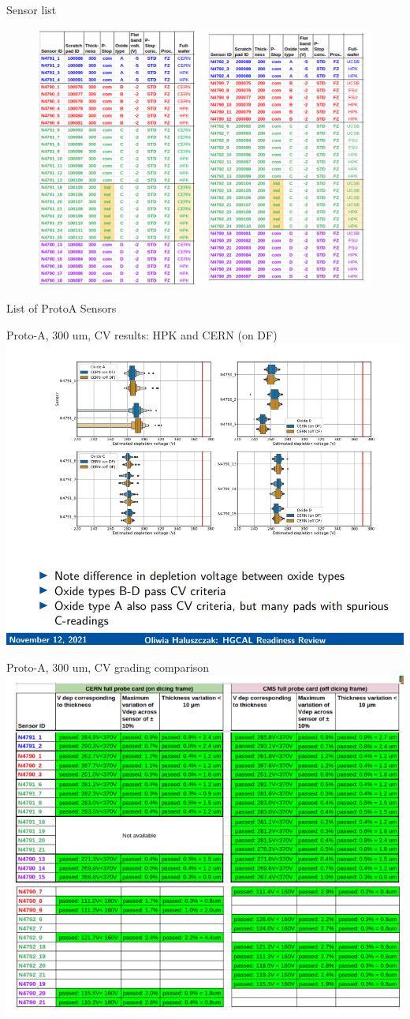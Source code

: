 \documentclass{beamer}
\begin{document}
\begin{frame}{Sensor list}
   \begin{figure}
       \includegraphics[width=.8\textwidth]{plots/Fall_2021_sensorList.png}
   \end{figure} 
\end{frame}


\begin{frame}{List of ProtoA Sensors}
    
\end{frame}

\begin{frame}{Proto-A, 300 um, CV results: HPK and CERN (on DF)}
  \includegraphics[width=.8\textwidth]{plots/CV_CERN_HPK_300um.png}
\end{frame}

\begin{frame}{Proto-A, 300 um, CV grading comparison}
  \includegraphics[width=.7\textwidth]{plots/CV_grading_300um.png}
\end{frame}
\end{document}
